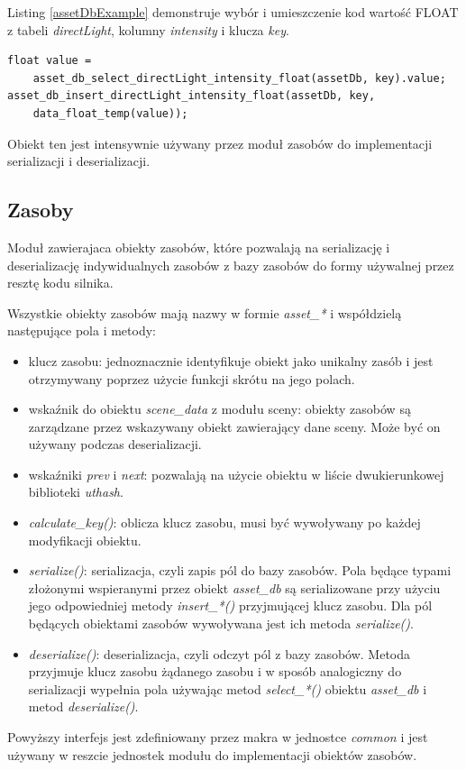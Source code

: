 Listing \ref{assetDbExample} demonstruje wybór i umieszczenie kod wartość FLOAT z tabeli \textit{directLight}, kolumny \textit{intensity} i klucza \textit{key}.
\lstset{language=C}
\begin{lstlisting}[caption={Deserializacja i serializacja wartości zmiennoprzecinkowej},captionpos=b,label={assetDbExample}]
float value =
	asset_db_select_directLight_intensity_float(assetDb, key).value;
asset_db_insert_directLight_intensity_float(assetDb, key,
	data_float_temp(value));
\end{lstlisting}

Obiekt ten jest intensywnie używany przez moduł zasobów do implementacji serializacji i deserializacji.

\subsection{Zasoby}

Moduł zawierajaca obiekty zasobów, które pozwalają na serializację i deserializację indywidualnych zasobów z bazy zasobów do formy używalnej przez resztę kodu silnika.

Wszystkie obiekty zasobów mają nazwy w formie \textit{asset\_*} i współdzielą następujące pola i metody:
\begin{itemize}
	\item klucz zasobu: jednoznacznie identyfikuje obiekt jako unikalny zasób i jest otrzymywany poprzez użycie funkcji skrótu na jego polach.
	\item wskaźnik do obiektu \textit{scene\_data} z modułu sceny: obiekty zasobów są zarządzane przez wskazywany obiekt zawierający dane sceny. Może być on używany podczas deserializacji.
	\item wskaźniki \textit{prev} i \textit{next}: pozwalają na użycie obiektu w liście dwukierunkowej biblioteki \textit{uthash}.
	\item \textit{calculate\_key()}: oblicza klucz zasobu, musi być wywoływany po każdej modyfikacji obiektu.
	\item \textit{serialize()}: serializacja, czyli zapis pól do bazy zasobów.
	Pola będące typami złożonymi wspieranymi przez obiekt \textit{asset\_db} są serializowane przy użyciu jego odpowiedniej metody \textit{insert\_*()} przyjmującej klucz zasobu.
	Dla pól będących obiektami zasobów wywoływana jest ich metoda \textit{serialize()}.
	\item \textit{deserialize()}: deserializacja, czyli odczyt pól z bazy zasobów.
	Metoda przyjmuje klucz zasobu żądanego zasobu i w sposób analogiczny do serializacji wypełnia pola używając metod \textit{select\_*()} obiektu \textit{asset\_db} i metod \textit{deserialize()}.
\end{itemize}
Powyższy interfejs jest zdefiniowany przez makra w jednostce \textit{common} i jest używany w reszcie jednostek modułu do implementacji obiektów zasobów.

